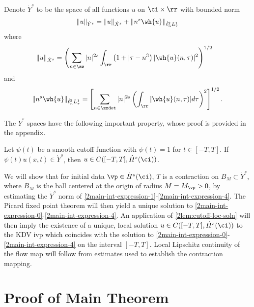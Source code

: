 \begin{definition}
	Denote $\dot{Y}^s$ to be the space of all
	functions $u$ on $\ci \times \rr$ with
	bounded norm
\begin{equation}
	\label{2Y-s-norm}
	\begin{split}
		\|u\|_{\dot{Y}^s} = \|u\|_{\dot{X}^s} + \|n^s \wh{u}\|_{\dot{\ell}^2_n L^1_\tau }
	\end{split}
\end{equation}
%
%
%
%
where
%
\begin{equation}
	\label{2Xs-norm}
	\begin{split}
		& \|u\|_{\dot{X}^s}
		= \left ( \sum_{n\in \zz} |n|^{2s} \int_\rr \left ( 1 + | 
		\tau - n^3 \right ) | \wh{u} ( n, \tau ) |^2
		\right )^{1/2}
	\end{split}
\end{equation}
and
%
%
\begin{equation}
	\label{2E-norm}
	\|n^s \wh{u}\|_{\dot{\ell}^2_n L^1_\tau } = \left[ \sum_{n \in \zzdot}| n |^{2s} \left(
	\int_{\rr}| \wh{u}(n, \tau) |d \tau \right)^{2} \right]^{1/2}.
\end{equation}
%
%
%
%
\end{definition}
The $\dot{Y}^s$ spaces have the following important property, whose proof
is provided in the appendix.
\begin{lemma}
	\label{2lem:cutoff-loc-soln}
	Let $\psi(t)$ be a smooth cutoff function with $\psi(t) =1$ for $t \in [-T, T]$. If
	$\psi(t)u(x,t) \in \dot{Y}^s$, then $u \in C([-T, T], \dot{H}^s(\ci))$.
\end{lemma}
%
%
We will 
show that for initial data $\vp \in \dot{H}^s(\ci)$, $T$ is a contraction on $B_M 
\subset \dot{Y}^s$, where $B_M$ is the ball centered at the origin of radius $M = 
M_{\vp}> 0$, by estimating the $\dot{Y}^s$
norm of \eqref{2main-int-expression-1}-\eqref{2main-int-expression-4}. The 
Picard fixed point theorem will
then yield a unique solution to
\eqref{2main-int-expression-0}-\eqref{2main-int-expression-4}. An application of
\cref{2lem:cutoff-loc-soln} will then imply the existence of a unique, local
solution $u \in C([-T, T], \dot{H}^s(\ci))$ to the KDV ivp which coincides with the solution to
\eqref{2main-int-expression-0}-\eqref{2main-int-expression-4} on the interval $[-T, T]$. Local Lipschitz continuity of the flow map will follow
from estimates used to establish the contraction mapping. %
%
%
%
%
%
%
%
\section{Proof of Main Theorem}
%
%
%
%
%
%
%
%
%
%
%
